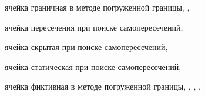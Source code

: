 ячейка граничная в методе погруженной границы, \pageref{term:cell_ibm_border}, \pageref{term:cell_ibm_border2}

ячейка пересечения при поиске самопересечений, \pageref{term:cell_intersect}

ячейка скрытая при поиске самопересечений, \pageref{term:cell_hidden}

ячейка статическая при поиске самопересечений, \pageref{term:cell_static}

ячейка фиктивная в методе погруженной границы, \pageref{term:cell_ibm_ghost}, \pageref{term:cell_ibm_ghost2}, \pageref{term:cell_ibm_ghost3}, \pageref{term:cell_ibm_ghost4}
